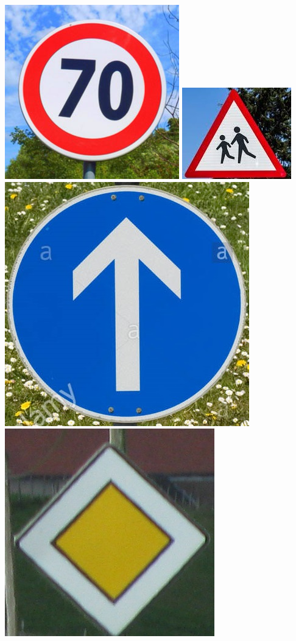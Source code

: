 \documentclass[11pt]{article}
\makeatletter
\def\maxwidth{\ifdim\Gin@nat@width>\linewidth\linewidth
    \else\Gin@nat@width\fi}
\let\Oldincludegraphics\includegraphics
\renewcommand{\includegraphics}[1]{\Oldincludegraphics[width=.8\maxwidth]{#1}}
\makeatother
\begin{document}
\includegraphics{sign examples/image1.jpg}
\includegraphics{sign examples/image2.jpg}
\includegraphics{sign examples/image3.jpg}
\includegraphics{sign examples/image4.jpg}
\end{document}
